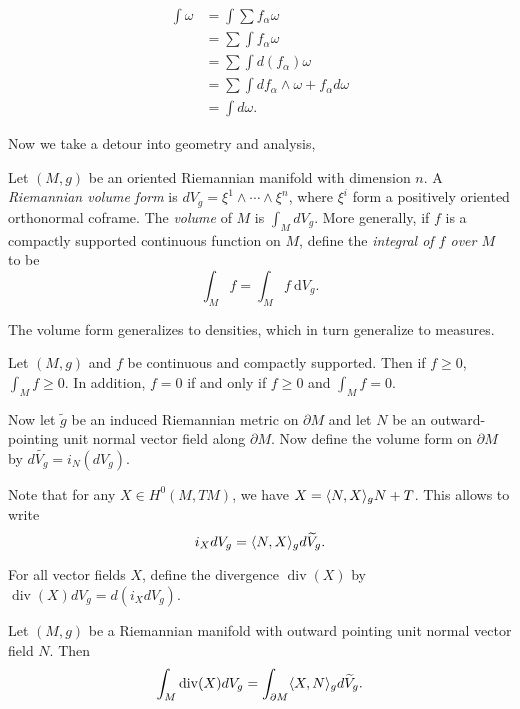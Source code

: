 \documentclass[twoside, 10pt]{article}
\renewcommand{\d}{\ \mathrm{d}}
\begin{document}
    \begin{align*} \int \omega &= \int \sum f_{\alpha} \omega \\ &= \sum \int
    f_{\alpha} \omega \\ &= \sum \int d (f_{\alpha}) \omega \\ &= \sum \int
df_{\alpha} \wedge \omega + f_{\alpha} d\omega \\ &= \int d\omega.
\end{align*}

    Now we take a detour into geometry and analysis,

    \begin{defn} Let $(M,g)$ be an oriented Riemannian manifold with dimension
        $n$. A \textit{Riemannian volume form} is $dV_g = \xi^1 \wedge \cdots
        \wedge \xi^n$, where $\xi^i$ form a positively oriented orthonormal
        coframe. The \textit{volume} of $M$ is $\int_M dV_g$. More generally,
        if $f$ is a compactly supported continuous function on $M$, define the
        \textit{integral of $f$ over $M$} to be \[ \int_M f = \int_M f\d V_g.\]
    \end{defn}

    \begin{rmk} The volume form generalizes to densities, which in turn
    generalize to measures.  \end{rmk}

    \begin{lem} Let $(M,g)$ and $f$ be continuous and compactly supported. Then
    if $f \geq 0$, $\int_M f \geq 0$. In addition, $f = 0$ if and only if $f
\geq 0$ and $\int_M f = 0$.  \end{lem}

    Now let $\widetilde{g}$ be an induced Riemannian metric on $\partial M$ and
    let $N$ be an outward-pointing unit normal vector field along $\partial M$.
    Now define the volume form on $\partial M$ by $d \widetilde{V_g} =
    i_N(dV_g)$.

    Note that for any $X \in H^0(M,TM)$, we have $X = \langle N,X\rangle_g N + T$.  This
    allows to write \[ i_X dV_g = \langle N,X\rangle_g d \widetilde{V}_g.\]

    \begin{defn} For all vector fields $X$, define the divergence
    $\operatorname{div}(X)$ by $\operatorname{div}(X) dV_g = d(i_X dV_g)$.
\end{defn}

    \begin{thm} Let $(M,g)$ be a Riemannian manifold with
        outward pointing unit normal vector field $N$. Then \[ \int_M
        \operatorname{div}(X) dV_g = \int_{\partial M} \langle X,N\rangle_g
    d\widetilde{V}_g.\] \end{thm}
\end{document}
